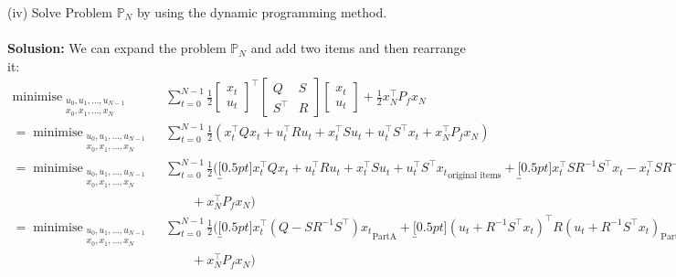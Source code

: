 \documentclass[a4paper,11pt,reqno]{amsart}
\newcommand{\tran}{\intercal}
\DeclareMathOperator*{\minimise}{minimise}
\begin{document}
(iv) Solve Problem $\mathbb{P}_N$ by using the dynamic programming method.
\\ \\
\textbf{Solusion:}
We can expand the problem $\mathbb{P}_N$ and add two items and then rearrange it:
\begin{align}
    \minimise_{\substack{u_0,u_1,\ldots,u_{N-1}\\ x_0,x_1,\ldots,x_N}} \,
    & \sum_{t=0}^{N-1}\textstyle\frac{1}{2}
    \begin{bmatrix}
        x_t\\
        u_t
    \end{bmatrix}^{\tran}
    \begin{bmatrix}
        Q&S\\
        S^{\tran}&R
    \end{bmatrix}
    \begin{bmatrix}
        x_t\\
        u_t
    \end{bmatrix}+\tfrac{1}{2}x_N^{\tran}P_fx_N
    \\
    =\minimise_{\substack{u_0,u_1,\ldots,u_{N-1}\\ x_0,x_1,\ldots,x_N}} \,
    &\sum_{t=0}^{N-1}\textstyle\frac{1}{2}
    (x_t^{\tran}Qx_t+u_t^{\tran}Ru_t+x_t^{\tran}Su_t+u_t^{\tran}S^{\tran}x_t
    +x_N^{\tran}P_fx_N)
    \\
    =\minimise_{\substack{u_0,u_1,\ldots,u_{N-1}\\ x_0,x_1,\ldots,x_N}} \,
    &\sum_{t=0}^{N-1}\textstyle\frac{1}{2}
    (\underbracket[0.5pt]{x_t^{\tran}Qx_t+u_t^{\tran}Ru_t+x_t^{\tran}Su_t+u_t^{\tran}S^{\tran}x_t}_{\text{original items}}
    +\underbracket[0.5pt]{x_t^{\tran}SR^{-1}S^{\tran}x_t-x_t^{\tran}SR^{-1}S^{\tran}x_t}_{\text{added items}}
    \\
    &\qquad+x_N^{\tran}P_fx_N)
    \\
    =\minimise_{\substack{u_0,u_1,\ldots,u_{N-1}\\ x_0,x_1,\ldots,x_N}} \,
    &\sum_{t=0}^{N-1}\textstyle\frac{1}{2}
    (\underbracket[0.5pt]{x_t^{\tran}(Q-SR^{-1}S^{\tran})x_t}_{\text{PartA}}+\underbracket[0.5pt]{(u_t+R^{-1}S^{\tran}x_t)^{\tran}R(u_t+R^{-1}S^{\tran}x_t)}_{\text{PartB}}
    \\
    &\qquad+x_N^{\tran}P_fx_N)
    \label{eq:P_N_matrix_rewrite}
\end{align}
\end{document}
